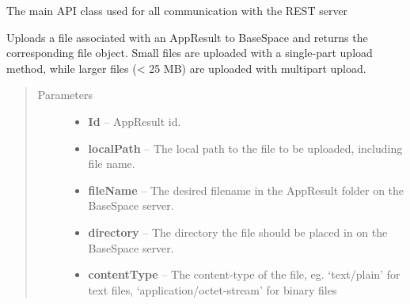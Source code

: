 \documentclass[letterpaper,10pt,english]{sphinxmanual}
\begin{document}
\begin{fulllineitems}
\label{Available modules:BaseSpacePy.api.BaseSpaceAPI.BaseSpaceAPI}
The main API class used for all communication with the REST server

\begin{fulllineitems}
\label{Available modules:BaseSpacePy.api.BaseSpaceAPI.BaseSpaceAPI.appResultFileUpload}
Uploads a file associated with an AppResult to BaseSpace and returns the corresponding file object.
Small files are uploaded with a single-part upload method, while larger files (\textless{} 25 MB) are uploaded
with multipart upload.
\begin{quote}\begin{description}
\item[{Parameters}] \leavevmode\begin{itemize}
\item {} 
\textbf{Id} -- AppResult id.

\item {} 
\textbf{localPath} -- The local path to the file to be uploaded, including file name.

\item {} 
\textbf{fileName} -- The desired filename in the AppResult folder on the BaseSpace server.

\item {} 
\textbf{directory} -- The directory the file should be placed in on the BaseSpace server.

\item {} 
\textbf{contentType} -- The content-type of the file, eg. `text/plain' for text files, `application/octet-stream' for binary files

\end{itemize}

\end{description}\end{quote}

\end{fulllineitems}



\end{fulllineitems}
\end{document}
